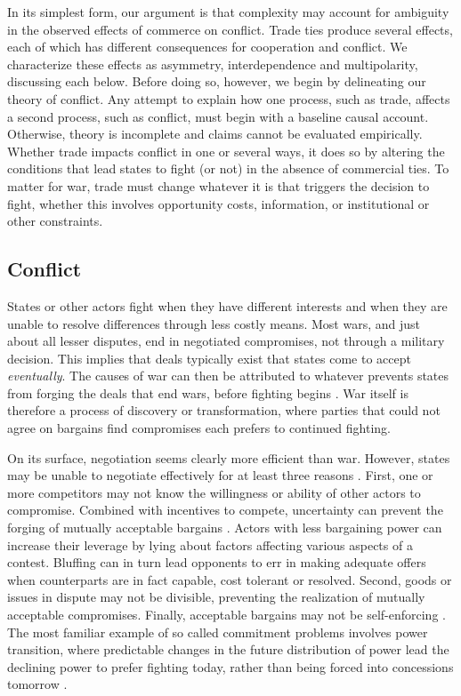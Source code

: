 \documentclass[12pt]{article}
\theoremstyle{hypothesis}
\begin{document}
In its simplest form, our argument is that complexity may account for ambiguity in the observed effects of commerce on conflict. Trade ties produce several effects, each of which has different consequences for cooperation and conflict.  We characterize these effects as asymmetry, interdependence and multipolarity, discussing each below.  Before doing so, however, we begin by delineating our theory of conflict.  Any attempt to explain how one process, such as trade, affects a second process, such as conflict, must begin with a baseline causal account.  Otherwise, theory is incomplete and claims cannot be evaluated empirically.  Whether trade impacts conflict in one or several ways, it does so by altering the conditions that lead states to fight (or not) in the absence of commercial ties.  To matter for war, trade must change whatever it is that triggers the decision to fight, whether this involves opportunity costs, information, or institutional or other constraints.

\subsection*{Conflict}

States or other actors fight when they have different interests and when they are unable to resolve differences through less costly means.  Most wars, and just about all lesser disputes, end in negotiated compromises, not through a military decision.  This implies that deals typically exist that states come to accept \textit{eventually}.  The causes of war can then be attributed to whatever prevents states from forging the deals that end wars, before fighting begins \citep{Blainey:1973,Morrow:1989,fearon:1995,powell:1999}.  War itself is therefore a process of discovery or transformation, where parties that could not agree on bargains find compromises each prefers to continued fighting.

On its surface, negotiation seems clearly more efficient than war.  However, states may be unable to negotiate effectively for at least three reasons \citep{fearon:1995}.  First, one or more competitors may not know the willingness or ability of other actors to compromise.  Combined with incentives to compete, uncertainty can prevent the forging of mutually acceptable bargains \citep{Morrow:1989,fearon:1995}.  Actors with less bargaining power can increase their leverage by lying about factors affecting various aspects of a contest.   Bluffing can in turn lead opponents to err in making adequate offers when counterparts are in fact capable, cost tolerant or resolved.  Second, goods or issues in dispute may not be divisible, preventing the realization of mutually acceptable compromises. Finally, acceptable bargains may not be self-enforcing \citep{Powell:1996a,Powell:2006}. The most familiar example of so called commitment problems involves power transition, where predictable changes in the future distribution of power lead the declining power to prefer fighting today, rather than being forced into concessions tomorrow \citep{Organski:1958,Organski:1980}.
\end{document}
